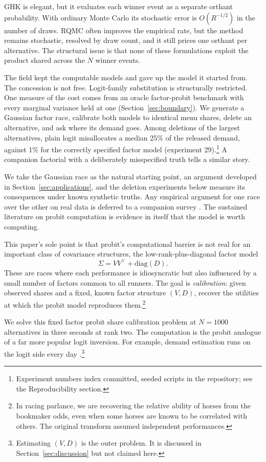 \documentclass[12pt]{article}
\theoremstyle{remark}
\begin{document}
GHK is elegant, but it evaluates each winner event as a separate
orthant probability. With ordinary Monte Carlo its stochastic error is
$O(R^{-1/2})$ in the number of draws. RQMC often improves the empirical
rate, but the method remains stochastic, resolved by draw count, and it
still prices one orthant per alternative. The structural issue is that
none of these formulations exploit the product shared across the $N$
winner events.

The field kept the
computable models and gave up the model it started from. The concession
is not free. Logit-family substitution is structurally
restricted. One measure of the cost comes from an oracle factor-probit
benchmark with every marginal variance held at one
(Section~\ref{sec:boundary}). We generate a Gaussian factor race,
calibrate both models to identical menu shares, delete an alternative,
and ask where its demand goes. Among deletions of the largest
alternatives, plain logit misallocates a median 25\% of the released
demand, against 1\% for the correctly specified factor model
(experiment 29).\footnote{Experiment numbers index committed, seeded
scripts in the repository; see the Reproducibility section.} A companion factorial with a deliberately misspecified
truth tells a similar story.

We take the Gaussian race as the natural starting point, an argument
developed in Section~\ref{sec:applications}, and the deletion experiments below measure
its consequences under known synthetic truths. Any empirical argument for one race over the other on
real data is deferred to a companion survey \citep{cottonsurvey}. The
sustained literature on probit computation is evidence in itself that
the model is worth computing.

This paper's sole point is that probit's computational barrier is not real for an important
class of covariance structures, the low-rank-plus-diagonal factor model
\[
\Sigma = VV^\top + \mathrm{diag}(D).
\]
These are races where each
performance is idiosyncratic but also influenced by a small number of
factors common to all runners. The goal is \emph{calibration}: given
observed shares and a fixed, known factor structure $(V, D)$, recover the
utilities at which the probit model reproduces them.\footnote{In racing
parlance, we are recovering the relative ability of horses from the
bookmaker odds, even when some horses are known to be correlated with
others. The original transform \citep{cotton2021} assumed independent
performances.} 

We solve this fixed factor probit share calibration problem at $N = 1000$ alternatives
in three seconds at rank two. The computation is the probit analogue of a far more popular logit inversion. For example, 
demand estimation runs on the logit side every day \citep{berry1995,conlon2020}.\footnote{Estimating $(V, D)$ is the outer problem. It is discussed in
Section~\ref{sec:discussion} but not claimed here.} 
\end{document}
